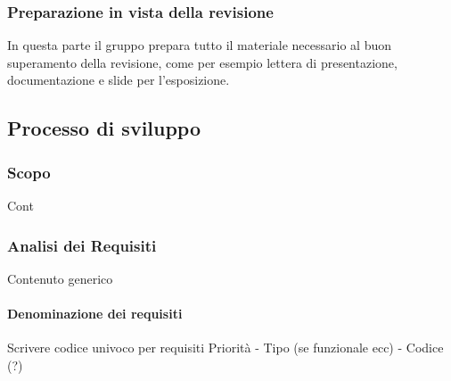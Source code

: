         \subsubsection{Preparazione in vista della revisione}
        In questa parte il gruppo prepara tutto il materiale necessario al buon superamento della revisione, come per esempio lettera di presentazione, documentazione e slide per l'esposizione.


    \subsection{Processo di sviluppo}\label{PP:Sviluppo}

        \subsubsection{Scopo}\label{PP:Sviluppo:Scopo}
        Cont


        \subsubsection{Analisi dei Requisiti}\label{PP:Sviluppo:AdR}
        Contenuto generico
        
        

		 \paragraph{Denominazione dei requisiti}\label{PP:Sviluppo:AdR:DenominazioneRequisiti}
		 Scrivere codice univoco per requisiti
		 Priorità - Tipo (se funzionale ecc) - Codice (?)
	
